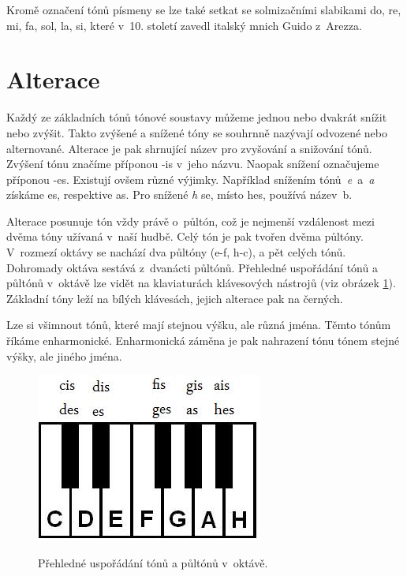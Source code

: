 Kromě označení tónů písmeny se lze také setkat se solmizačními slabikami do, re, mi, fa, sol, la, si,
které v~10. století zavedl italský mnich Guido z~Arezza.
\cite{cmiral}
\par    

\section{Alterace}
Každý ze základních tónů tónové soustavy můžeme jednou nebo dvakrát snížit nebo zvýšit.
Takto zvýšené a snížené tóny se souhrnně nazývají odvozené nebo alternované.
Alterace je pak shrnující název pro zvyšování a snižování tónů.
Zvýšení tónu značíme příponou -is v~jeho názvu.
Naopak snížení označujeme příponou -es.
Existují ovšem různé výjimky.
Například snížením tónů\emph{~e}~a\emph{~a} získáme es, respektive as.
Pro snížené \emph{h} se, místo hes, používá název~b.
\cite{zenkl}
\par

Alterace posunuje tón vždy právě o~půltón, 
což je nejmenší vzdálenost mezi dvěma tóny užívaná v~naší hudbě.
Celý tón je pak tvořen dvěma půltóny. 
V~rozmezí oktávy se nachází dva půltóny ({e-f, h-c}), a pět celých tónů.
Dohromady oktáva sestává z~dvanácti půltónů.
Přehledné uspořádání tónů a půltónů v~oktávě lze vidět na klaviaturách klávesových nástrojů (viz obrázek \ref{obrazekRozlozeniKlaviatury}).
Základní tóny leží na bílých klávesách, jejich alterace pak na černých.
\cite{zenkl,cmiral}
\par

Lze si všimnout tónů, které mají stejnou výšku, ale různá jména.
Těmto tónům říkáme enharmonické. Enharmonická záměna je pak nahrazení tónu tónem stejné výšky, ale jiného jména.\cite{zenkl}

\begin{figure}[h]\centering
    \centering
    \includegraphics[width=0.4\linewidth]{obrazky/klaviatura.jpg}\\[1pt]  
    \caption{Přehledné uspořádání tónů a půltónů v~oktávě. }    
    \label{obrazekRozlozeniKlaviatury}
\end{figure}

